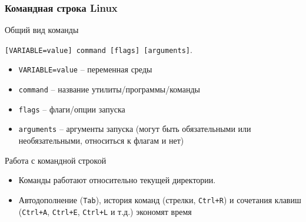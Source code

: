 \documentclass[aspectratio=169]{beamer}
\newcommand{\cmd}[1]{\texttt{#1}}
\begin{document}
\begin{frame}[fragile]
\frametitle{Командная строка Linux}
\begin{block}{Общий вид команды}
\begin{center}
	\cmd{[VARIABLE=value] command  [flags]  [arguments]}.
\end{center}
\begin{itemize}
	\item \texttt{VARIABLE=value} -- переменная среды
	\item \texttt{command} -- название утилиты/программы/команды
	\item \texttt{flags} -- флаги/опции запуска
	\item \texttt{arguments} -- аргументы запуска (могут быть обязательными или необязательными, относиться к флагам и нет)
\end{itemize}
\end{block}
\begin{block}{Работа с командной строкой}
\begin{itemize}
	\item Команды работают относительно текущей директории.
	\item Автодополнение (\cmd{Tab}), история команд (стрелки, \cmd{Ctrl+R}) и сочетания клавиш (\cmd{Ctrl+A}, \cmd{Ctrl+E}, \cmd{Ctrl+L} и т.д.) экономят время
\end{itemize}
\end{block}
\vfill
\end{frame}
\end{document}

